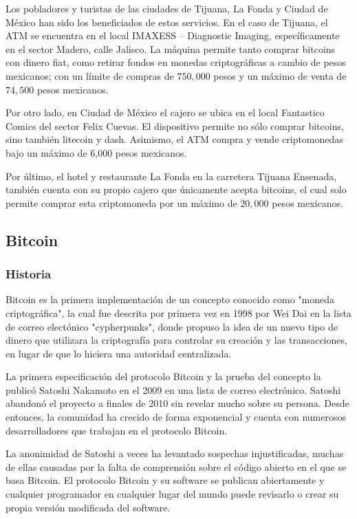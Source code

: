 \documentclass[12pt,letterpaper]{article}
\begin{document}
Los pobladores y turistas de las ciudades de Tijuana, La Fonda y Ciudad de M\'exico han sido los beneficiados de estos servicios. En el caso de Tijuana, el ATM se encuentra en el local IMAXESS – Diagnostic Imaging, espec\'ificamente en el sector Madero, calle Jalisco. La m\'aquina permite tanto comprar bitcoins con dinero fiat, como retirar fondos en monedas criptogr\'aficas a cambio de pesos mexicanos; con un l\'imite de compras de $750,000$ pesos y un m\'aximo de venta de $74,500$ pesos mexicanos.

Por otro lado, en Ciudad de M\'exico el cajero se ubica en el local Fantastico Comics del sector Felix Cuevas. El dispositivo permite no s\'olo comprar bitcoins, sino tambi\'en litecoin y dash. Asimismo, el ATM compra y vende criptomonedas bajo un m\'aximo de 6,000 pesos mexicanos.

Por \'ultimo, el hotel y restaurante La Fonda en la carretera Tijuana Ensenada, tambi\'en cuenta con su propio cajero que \'unicamente acepta bitcoins, el cual solo permite comprar esta criptomoneda por un m\'aximo de $20,000$ pesos mexicanos.
	\subsection*{Bitcoin}
        \subsubsection*{Historia}
Bitcoin es la primera implementaci\'on de un concepto conocido como "moneda criptogr\'afica", la cual fue descrita por primera vez en 1998 por Wei Dai en la lista de correo elect\'onico "cypherpunks", donde propuso la idea de un nuevo tipo de dinero que utilizara la criptograf\'ia para controlar su creaci\'on y las transacciones, en lugar de que lo hiciera una autoridad centralizada.

 La primera especificaci\'on del protocolo Bitcoin y la prueba del concepto la public\'o Satoshi Nakamoto en el 2009 en una lista de correo electr\'onico. Satoshi abandon\'o el proyecto a finales de 2010 sin revelar mucho sobre su persona. Desde entonces, la comunidad ha crecido de forma exponencial y cuenta con numerosos desarrolladores que trabajan en el protocolo Bitcoin.

La anonimidad de Satoshi a veces ha levantado sospechas injustificadas, muchas de ellas causadas por la falta de comprensi\'on sobre el c\'odigo abierto en el que se basa Bitcoin. El protocolo Bitcoin y su software se publican abiertamente y cualquier programador en cualquier lugar del mundo puede revisarlo o crear su propia versi\'on modificada del software. 
\end{document}
